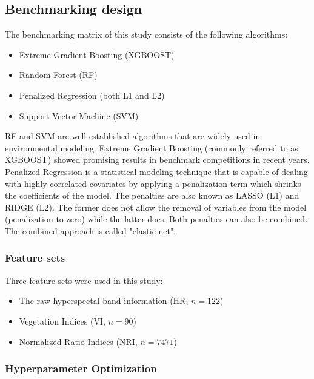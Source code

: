 \documentclass[review]{elsarticle}
\begin{document}
\subsection{Benchmarking design}

The benchmarking matrix of this study consists of the following algorithms:

\begin{itemize}
	\item  Extreme Gradient Boosting (\ac{XGBOOST})
	\item  Random Forest (\ac{RF})
	\item  Penalized Regression (both L1 and L2)
	\item  Support Vector Machine (\ac{SVM})
\end{itemize}

\ac{RF} and {SVM} are well established algorithms that are widely used in environmental modeling.
Extreme Gradient Boosting (commonly referred to as \ac{XGBOOST}) showed promising results in benchmark competitions in recent years.
Penalized Regression is a statistical modeling technique that is capable of dealing with highly-correlated covariates by applying a penalization term which shrinks the coefficients of the model.
The penalties are also known as LASSO (L1) and RIDGE (L2).
The former does not allow the removal of variables from the model (penalization to zero) while the latter does.
Both penalties can also be combined.
The combined approach is called "elastic net".

\subsubsection{Feature sets}

Three feature sets were used in this study:

\begin{itemize}
	\item The raw hyperspectal band information (HR, $n = 122$)
	\item Vegetation Indices (\ac{VI}, $n = 90$)
	\item Normalized Ratio Indices (\ac{NRI}, $n = 7471$)
\end{itemize}


\subsubsection{Hyperparameter Optimization}
\end{document}
